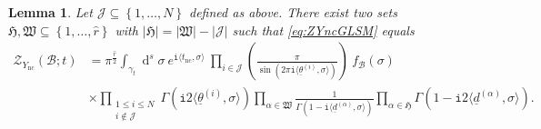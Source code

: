 \documentclass[12pt,a4paper,oneside]{amsart}
\numberwithin{equation}{section}
\newtheorem{lem}[thm]{Lemma}
\theoremstyle{definition}
\theoremstyle{remark}
\DeclareMathOperator{\dd}{d}
\newcommand{\mz}{\mathcal{Z}}
\newcommand{\Br}{\mathcal{B}}
\newcommand{\Ync}{Y_{\mathrm{nc}}}
\newcommand{\ii}{\mathtt{i}}
\newcommand{\tnc}{t_{\mathrm{nc}}}
\begin{document}
\begin{lem}
Let $\mathcal{J} \subseteq \left\{ 1, \dots, N \right\}$ defined as above. There exist two sets $\mathfrak{H},\mathfrak{W} \subseteq \left\{ 1, \dots, \hat{r} \right\}$ with $\lvert \mathfrak{H}\rvert =\lvert \mathfrak{W}\rvert - \lvert \mathcal{J} \rvert $ such that \eqref{eq:ZYncGLSM} equals 
\begin{equation}
\begin{aligned}
	\mz_{\Ync} \left( \Br; t \right) &= \pi^{\frac{\hat{r}}{2}}  \int_{\gamma_t} \dd^s \sigma~ e^{\ii \langle \tnc, \sigma\rangle } ~ \prod_{i \in \mathcal{J} } \left( \frac{\pi}{\sin \left( 2 \pi \ii \langle \underline{\theta}^{(i)}, \sigma \rangle\right)} \right) ~f_{\Br} (\sigma) \\
		&\times \prod_{\substack{ 1 \le i \le N \\ i \notin \mathcal{J} }} \Gamma \left( \ii 2 \langle \underline{\theta}^{(i)}, \sigma \rangle \right) \prod_{\alpha \in \mathfrak{W}} \frac{1}{\Gamma \left( 1 - \ii \langle\underline{d}^{(\alpha)}, \sigma \rangle \right)} \prod_{\alpha\in \mathfrak{H} } \Gamma \left( 1 - \ii 2 \langle\underline{d}^{(\alpha)}, \sigma \rangle \right) .
\end{aligned}
\label{eq:ZYnclemma1}
\end{equation}
\end{lem}
\end{document}
